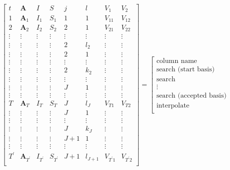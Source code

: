 \begin{equation}
\renewcommand\arraystretch{2}  %
\left[
\begin{array}{c|ccc|cc|cc}
t & \mathbf{A} & I & S & j &  l  & V_{1} & V_{2}\\
\hline
1 & \mathbf{A}_1 & I_1 & S_1 & 1 & 1 & V_{11} & V_{12}\\
\hline
2 & \mathbf{A}_2 & I_2 & S_2 & 2 & 1  & V_{21}  & V_{22}\\
\vdots & \vdots &\vdots &\vdots  &\vdots & \vdots &\vdots  &\vdots\\
\vdots & \vdots & \vdots &\vdots & 2 & l_2 & \vdots  & \vdots\\
\hline
\vdots &\vdots & \vdots &\vdots & 2  & 1& \vdots & \vdots\\
\vdots &\vdots &\vdots &\vdots &\vdots & \vdots & \vdots  &\vdots \\
\vdots &\vdots &\vdots &\vdots & 2 & k_2 &\vdots  & \vdots\\
\hline
\vdots &\vdots &\vdots &\vdots &\vdots & \vdots &\vdots &\vdots \\
\hline
\vdots & \vdots & \vdots &\vdots  & J &  1 & \vdots & \vdots \\
\vdots &\vdots &\vdots &\vdots &\vdots & \vdots &\vdots &\vdots \\
T & \mathbf{A}_T & I_T &S_T  & J &  l_{J} & V_{T1}& V_{T2}\\
\hline
\vdots &\vdots & \vdots &\vdots & J  & 1& \vdots & \vdots\\
\vdots &\vdots &\vdots &\vdots &\vdots & \vdots & \vdots  &\vdots \\
\vdots &\vdots &\vdots &\vdots & J & k_J &\vdots  & \vdots\\
\hline
\vdots& \vdots & \vdots & \vdots & J+1 & 1 & \vdots& \vdots\\
\vdots &\vdots &\vdots &\vdots &\vdots & \vdots &\vdots &\vdots \\
T^\prime & \mathbf{A}_{T^\prime} & I_{T^\prime} &S_{T^\prime}  & J+1 &  l_{J+1} & V_{T^\prime 1}& V_{T^\prime 2}\\
\end{array}
\right]
= 
\left[
\begin{array}{c}
\text{column name} \\
\hline
\text{search (start basis)} \\
\hline
\text{search} \\
\vdots \\
\text{search (accepted basis)} \\
\hline
\text{interpolate} \\

\end{array}
\end{equation}
